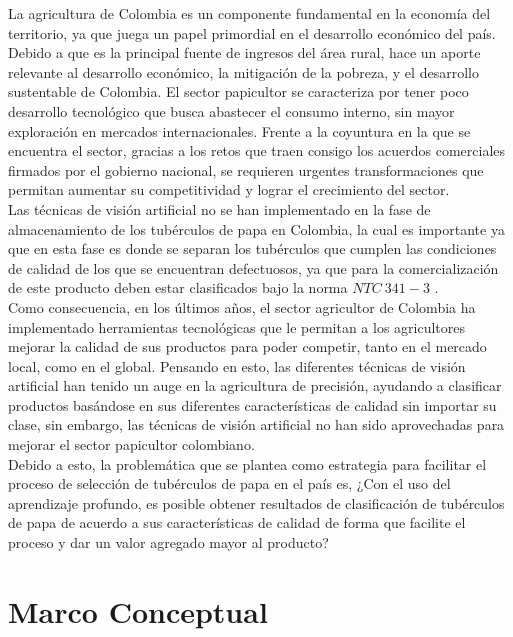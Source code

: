 La agricultura de Colombia es un componente fundamental en la economía del territorio, ya que juega un papel primordial en el desarrollo económico del país. Debido a que es la principal fuente de ingresos del área rural, hace un aporte relevante al desarrollo económico, la mitigación de la pobreza, y el desarrollo sustentable de Colombia. El sector papicultor se caracteriza por tener poco desarrollo tecnológico que busca abastecer el consumo interno, sin mayor exploración en mercados internacionales. Frente a la coyuntura en la que se encuentra el sector, gracias a los retos que traen consigo los acuerdos comerciales firmados por el gobierno nacional, se requieren urgentes transformaciones que permitan aumentar su competitividad y lograr el crecimiento del sector.\\

Las técnicas de visión artificial no se han implementado en la fase de almacenamiento de los tubérculos de papa en Colombia, la cual es importante ya que en esta fase es donde se separan los tubérculos que cumplen las condiciones de calidad de los que se encuentran defectuosos, ya que para la comercialización de este producto deben estar clasificados bajo la norma $NTC \ 341-3$ \cite{ntc341}. \\

Como consecuencia, en los últimos años, el sector agricultor de Colombia ha implementado herramientas tecnológicas que le permitan a los agricultores mejorar la calidad de sus productos para poder competir, tanto en el mercado local, como en el global. Pensando en esto, las diferentes técnicas de visión artificial han tenido un auge en la agricultura de precisión, ayudando a clasificar productos basándose en sus diferentes características de calidad sin importar su clase, sin embargo, las técnicas de visión artificial no han sido aprovechadas para mejorar el sector papicultor colombiano. \\


Debido a esto, la problemática que se plantea como estrategia para facilitar el proceso de selección de tubérculos de papa en el país es, ¿Con el uso del aprendizaje profundo, es posible obtener resultados de clasificación de tubérculos de papa de acuerdo a sus características de calidad de forma que facilite el proceso y dar un valor agregado mayor al producto?\\


\chapter{Marco Conceptual}

